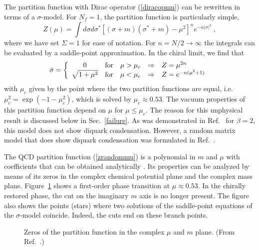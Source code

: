 The partition function with Dirac operator (\ref{diracopmu}) can be
rewritten in terms of a $\sigma$-model. For $N_f= 1 $, the partition
function is particularly simple,
\begin{equation}
  Z(\mu) =\int d\sigma d\sigma^* [(\sigma+m)(\sigma^*+m) - \mu^2]^n
  e^{-n|\sigma|^2}\:, 
\label{zmusig}
\end{equation}
where we have set $\Sigma=1$ for ease of notation.  For $n=N/2\rightarrow
\infty$ the integrals can be evaluated by a saddle-point
approximation. In the chiral limit, we find that \cite{Misha}
\begin{equation}
  \bar \sigma = \left\{
    \begin{array}{ccccl}
      0 & {\rm for} & \mu >\mu_c & \Rightarrow & Z = \mu^{2n} \\
      \sqrt{1+\mu^2} & {\rm for} & \mu < \mu_c & \Rightarrow & 
      Z = e^{-n(\mu^2 + 1)}
    \end{array}\right.
\end{equation}
with $\mu_c$ given by the point where the two partition functions are
equal, i.e.\ $\mu_c^2 = \exp(-1-\mu_c^2)$, which is solved by $\mu_c
\approx 0.53$. The vacuum properties of this partition function depend
on $\mu$ for $\mu \le \mu_c$. The reason for this unphysical result
is discussed below in Sec.~\ref{failure}. As was demonstrated in
Ref.~\cite{Vanderheyden99} for $\beta =2$, this model does not show diquark
condensation.  However, a random matrix model that does show diquark
condensation was formulated in Ref.~\cite{Vanderheyden00}.

The QCD partition function (\ref{zrandommu}) is a polynomial in $m$
and $\mu$ with coefficients that can be obtained analytically
\cite{Halaszyl}.  Its properties can be analyzed by means of its zeros
in the complex chemical potential plane and the complex mass plane.
Figure~\ref{ylfig} shows a first-order phase transition at $\mu
\approx 0.53$. In the chirally restored phase, the cut on the imaginary
$m$ axis is no longer present. The figure also shows the points (stars) where
two solutions of the saddle-point equations of the $\sigma$-model
coincide. Indeed, the cuts end on these branch points.
\begin{figure}
  \begin{center}
    \caption{Zeros of the partition function in the complex $\mu$ and
      $m$ plane.  (From Ref.~\cite{Halaszyl}.)} 
    \label{ylfig}
  \end{center}
\end{figure}

